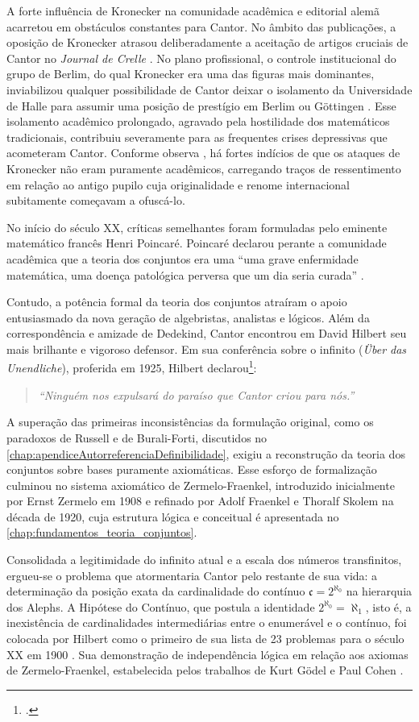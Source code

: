 A forte influência de Kronecker na comunidade acadêmica e editorial alemã acarretou em obstáculos constantes para Cantor. No âmbito das publicações, a oposição de Kronecker atrasou deliberadamente a aceitação de artigos cruciais de Cantor no \emph{Journal de Crelle} \parencite[p.~165]{dauben1990}. No plano profissional, o controle institucional do grupo de Berlim, do qual Kronecker era uma das figuras mais dominantes, inviabilizou qualquer possibilidade de Cantor deixar o isolamento da Universidade de Halle para assumir uma posição de prestígio em Berlim ou Göttingen \parencite[p.~163]{dauben1990}. Esse isolamento acadêmico prolongado, agravado pela hostilidade dos matemáticos tradicionais, contribuiu severamente para as frequentes crises depressivas que acometeram Cantor. Conforme observa \textcite[p.~65]{maor1991}, há fortes indícios de que os ataques de Kronecker não eram puramente acadêmicos, carregando traços de ressentimento em relação ao antigo pupilo cuja originalidade e renome internacional subitamente começavam a ofuscá-lo.

No início do século XX, críticas semelhantes foram formuladas pelo eminente matemático francês Henri Poincaré. Poincaré declarou perante a comunidade acadêmica que a teoria dos conjuntos era uma ``uma grave enfermidade matemática, uma doença patológica perversa que um dia seria curada'' \parencite[p.~1]{dauben1990}.

Contudo, a potência formal da teoria dos conjuntos atraíram o apoio entusiasmado da nova geração de algebristas, analistas e lógicos. Além da correspondência e amizade de Dedekind, Cantor encontrou em David Hilbert seu mais brilhante e vigoroso defensor. Em sua conferência sobre o infinito (\emph{Über das Unendliche}), proferida em 1925, Hilbert declarou\footcite[p.~64]{maor1991}:
\begin{quote}
    \textit{``Ninguém nos expulsará do paraíso que Cantor criou para nós.''}
\end{quote}

A superação das primeiras inconsistências da formulação original, como os paradoxos de Russell e de Burali-Forti, discutidos no \autoref{chap:apendiceAutorreferenciaDefinibilidade}, exigiu a reconstrução da teoria dos conjuntos sobre bases puramente axiomáticas. Esse esforço de formalização culminou no sistema axiomático de Zermelo-Fraenkel, introduzido inicialmente por Ernst Zermelo em 1908 e refinado por Adolf Fraenkel e Thoralf Skolem na década de 1920, cuja estrutura lógica e conceitual é apresentada no \autoref{chap:fundamentos_teoria_conjuntos}.

Consolidada a legitimidade do infinito atual e a escala dos números transfinitos, ergueu-se o problema que atormentaria Cantor pelo restante de sua vida: a determinação da posição exata da cardinalidade do contínuo \(\mathfrak{c} = 2^{\aleph_0}\) na hierarquia dos Alephs. A Hipótese do Contínuo, que postula a identidade \(2^{\aleph_0} = \aleph_1\), isto é, a inexistência de cardinalidades intermediárias entre o enumerável e o contínuo, foi colocada por Hilbert como o primeiro de sua lista de 23 problemas para o século XX em 1900 \parencite[p.~247]{dauben1990}. Sua demonstração de independência lógica em relação aos axiomas de Zermelo-Fraenkel, estabelecida pelos trabalhos de Kurt Gödel e Paul Cohen \parencite[p.~268]{dauben1990}.

